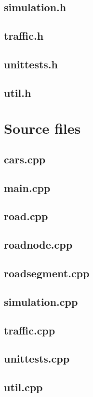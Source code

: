 \documentclass{article}
\begin{document}
  \subsection{simulation.h}
    
  \subsection{traffic.h}
    
  \subsection{unittests.h}
    
  \subsection{util.h}
    
\section{Source files}
  \subsection{cars.cpp}
    
  \subsection{main.cpp}
    
  \subsection{road.cpp}
    
  \subsection{roadnode.cpp}
    
  \subsection{roadsegment.cpp}
    
  \subsection{simulation.cpp}
    
  \subsection{traffic.cpp}
    
  \subsection{unittests.cpp}
    
  \subsection{util.cpp}
    
\end{document}
